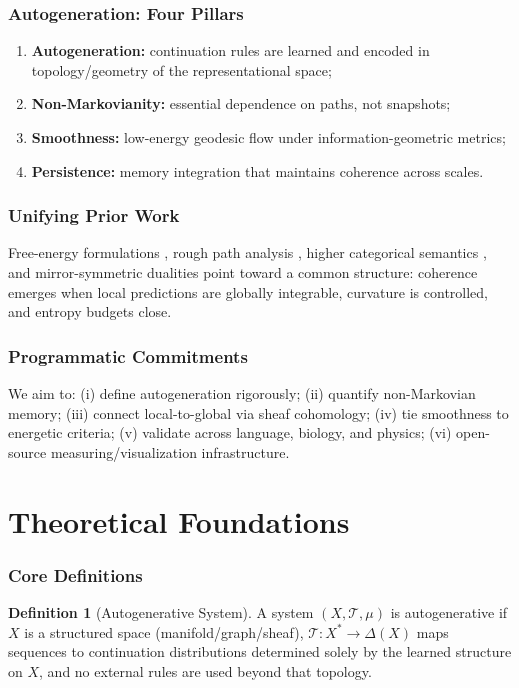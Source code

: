 \documentclass[12pt,a4paper]{article}
\theoremstyle{definition}
\newtheorem{definition}{Definition}[section]
\begin{document}
\section{Autogeneration: Four Pillars}
\begin{enumerate}[nosep]
  \item \textbf{Autogeneration:} continuation rules are learned and encoded in topology/geometry of the representational space;
  \item \textbf{Non-Markovianity:} essential dependence on paths, not snapshots;
  \item \textbf{Smoothness:} low-energy geodesic flow under information-geometric metrics;
  \item \textbf{Persistence:} memory integration that maintains coherence across scales.
\end{enumerate}

\section{Unifying Prior Work}
Free-energy formulations \parencite{friston2019freeenergy}, rough path analysis \parencite{lyons1998roughpaths}, higher categorical semantics \parencite{lurie2009htt}, and mirror-symmetric dualities \parencite{kontsevich1994mirror} point toward a common structure: coherence emerges when local predictions are globally integrable, curvature is controlled, and entropy budgets close.

\section{Programmatic Commitments}
We aim to: (i) define autogeneration rigorously; (ii) quantify non-Markovian memory; (iii) connect local-to-global via sheaf cohomology; (iv) tie smoothness to energetic criteria; (v) validate across language, biology, and physics; (vi) open-source measuring/visualization infrastructure.

\part{Theoretical Foundations}

\section{Core Definitions}
\begin{definition}[Autogenerative System]
A system $(X,\mathcal{T},\mu)$ is autogenerative if $X$ is a structured space (manifold/graph/sheaf), $\mathcal{T}:X^*\!\to\!\Delta(X)$ maps sequences to continuation distributions determined solely by the learned structure on $X$, and no external rules are used beyond that topology.
\end{definition}
\end{document}
